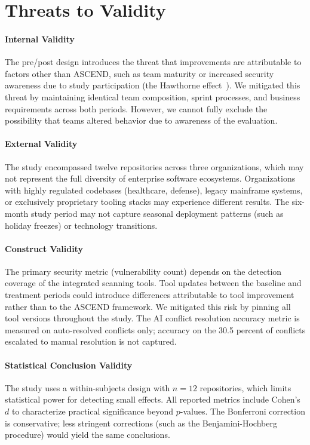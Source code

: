 \documentclass{ieeeaccess}
\begin{document}
\section{Threats to Validity}
\label{sec:threats}

\paragraph*{Internal Validity}
The pre/post design introduces the threat that improvements are attributable to factors other than ASCEND, such as team maturity or increased security awareness due to study participation (the Hawthorne effect~\cite{landsberger1958hawthorne}). We mitigated this threat by maintaining identical team composition, sprint processes, and business requirements across both periods. However, we cannot fully exclude the possibility that teams altered behavior due to awareness of the evaluation.

\paragraph*{External Validity}
The study encompassed twelve repositories across three organizations, which may not represent the full diversity of enterprise software ecosystems. Organizations with highly regulated codebases (healthcare, defense), legacy mainframe systems, or exclusively proprietary tooling stacks may experience different results. The six-month study period may not capture seasonal deployment patterns (such as holiday freezes) or technology transitions.

\paragraph*{Construct Validity}
The primary security metric (vulnerability count) depends on the detection coverage of the integrated scanning tools. Tool updates between the baseline and treatment periods could introduce differences attributable to tool improvement rather than to the ASCEND framework. We mitigated this risk by pinning all tool versions throughout the study. The AI conflict resolution accuracy metric is measured on auto-resolved conflicts only; accuracy on the 30.5 percent of conflicts escalated to manual resolution is not captured.

\paragraph*{Statistical Conclusion Validity}
The study uses a within-subjects design with $n = 12$ repositories, which limits statistical power for detecting small effects. All reported metrics include Cohen's $d$ to characterize practical significance beyond $p$-values. The Bonferroni correction is conservative; less stringent corrections (such as the Benjamini-Hochberg procedure) would yield the same conclusions.
\end{document}
